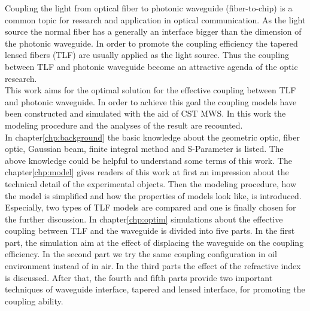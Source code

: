 
Coupling the light from optical fiber to photonic waveguide (fiber-to-chip) is a common topic for research and application in optical communication. As the light source the normal fiber has a generally an interface bigger than the dimension of the photonic waveguide. In order to promote the coupling efficiency the tapered lensed fibers (TLF) are usually applied as the light source. Thus the coupling between TLF and photonic waveguide become an attractive agenda of the optic research. \\ 

This work aims for the optimal solution for the effective coupling between TLF and photonic waveguide. In order to achieve this goal the coupling models have been constructed and simulated with the aid of CST MWS. In this work the modeling procedure and the analyses of the result are recounted.\\

In chapter\ref{chp:background} the basic knowledge about the geometric optic, fiber optic, Gaussian beam, finite integral method and S-Parameter is listed. The above knowledge could be helpful to understand some terms of this work. The chapter\ref{chp:model} gives readers of this work at first an impression about the technical detail of the experimental objects. Then the modeling procedure, how the model is simplified and how the properties of models look like, is introduced. Especially, two types of TLF models are compared and one is finally chosen for the further discussion. In chapter\ref{chp:optim} simulations about the effective coupling between TLF and the waveguide is divided into five parts. In the first part, the simulation aim at the effect of displacing the waveguide on the coupling efficiency. In the second part we try the same coupling configuration in oil environment instead of in air. In the third parts the effect of the refractive index is discussed. After that, the fourth and fifth parts provide two important techniques of waveguide interface, tapered and lensed interface, for promoting the coupling ability.\\        
 
